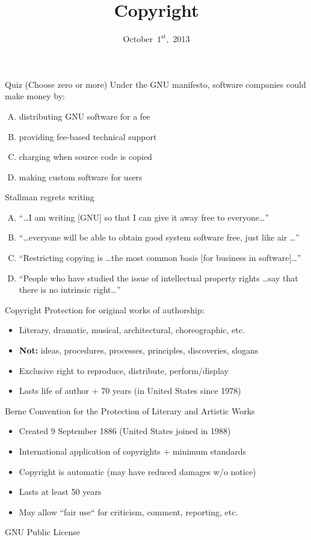 \documentclass{beamer}
\title{Copyright}
\date{October~$1^{\text{st}}$,~2013}
\begin{document}
\begin{frame}
\titlepage
\end{frame}

\begin{frame}{Quiz \hfill (Choose zero or more)}
Under the GNU manifesto, software companies could make money by:
\begin{enumerate}[(A)]
\item<1-2> distributing GNU software for a fee
\item<1-2> providing fee-based technical support
\item<1> charging when source code is copied
\item<1-2> making custom software for users
\end{enumerate}
\medskip
Stallman regrets writing
\begin{enumerate}[(A)]
\item<1-2> ``\ldots I am writing [GNU] so that I can give it away free to everyone\ldots''
\item<1-2> ``\ldots everyone will be able to obtain good system software free, just like air \ldots''
\item<1-2> ``Restricting copying is \ldots the most common basis [for business in software]\ldots''
\item<1-2> ``People who have studied the issue of intellectual property rights \ldots say that there is no intrinsic right\ldots''
\end{enumerate}
\end{frame}

\begin{frame}{Copyright}
Protection for original works of authorship:
\begin{itemize}
\item Literary, dramatic, musical, architectural, choreographic, etc.
\item \textbf{Not:} ideas, procedures, processes, principles, discoveries, slogans
\item Exclusive right to reproduce, distribute, perform/display
\item Lasts life of author + 70 years (in United States since 1978)
\end{itemize}
\bigskip
Berne Convention for the Protection of Literary and Artistic Works
\begin{itemize}
\item Created 9 September 1886 (United States joined in 1988)
\item International application of copyrights + minimum standards 
\item Copyright is automatic (may have reduced damages w/o notice)
\item Lasts at least 50 years
\item May allow ``fair use`` for criticism, comment, reporting, etc.
\end{itemize}
\end{frame}

\begin{frame}{GNU Public License}
\end{frame}
\end{document}
